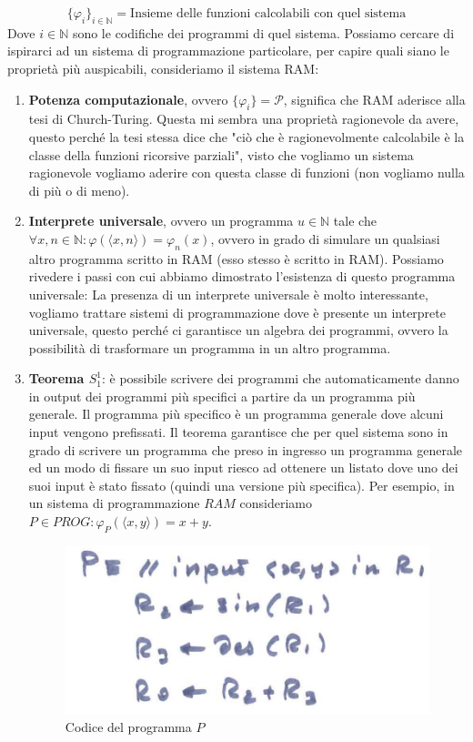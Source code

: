 \documentclass{article}
\begin{document}
$$\{\varphi_i\}_{i\in\mathbb{N}}=\text{Insieme delle funzioni calcolabili con quel sistema}$$
Dove $i\in\mathbb{N}$ sono le codifiche dei programmi di quel sistema.
Possiamo cercare di ispirarci ad un sistema di programmazione particolare, per capire
quali siano le proprietà più auspicabili, consideriamo il sistema RAM:
\begin{enumerate}
    \item \textbf{Potenza computazionale}, ovvero $\{\varphi_i\}=\mathcal{P}$, significa che RAM
          aderisce alla tesi di Church-Turing. Questa mi sembra una proprietà ragionevole da avere,
          questo perché la tesi stessa dice che "ciò che è ragionevolmente calcolabile è la classe della
          funzioni ricorsive parziali", visto che vogliamo un sistema ragionevole vogliamo aderire con
          questa classe di funzioni (non vogliamo nulla di più o di meno).
    \item \textbf{Interprete universale}, ovvero un programma $u\in\mathbb{N}$ tale che
          $\forall x,n\in\mathbb{N}:\varphi(\langle x,n\rangle)=\varphi_n(x)$, ovvero in grado di
          simulare un qualsiasi altro programma scritto in RAM (esso stesso è scritto in RAM). Possiamo
          rivedere i passi con cui abbiamo dimostrato l'esistenza di questo programma universale:
          La presenza di un interprete universale è molto interessante, vogliamo trattare sistemi di programmazione
          dove è presente un interprete universale, questo perché ci garantisce un algebra dei programmi, ovvero
          la possibilità di trasformare un programma in un altro programma.
    \item \textbf{Teorema $S_1^1$}: è possibile scrivere dei programmi che automaticamente danno in output dei programmi
          più specifici a partire da un programma più generale. Il programma più specifico è un programma generale dove
          alcuni input vengono prefissati. Il teorema garantisce che per quel sistema sono in grado di scrivere un programma
          che preso in ingresso un programma generale ed un modo di fissare un suo input riesco ad ottenere un listato dove uno dei
          suoi input è stato fissato (quindi una versione più specifica).
          Per esempio, in un sistema di programmazione $RAM$ consideriamo $P\in PROG:\varphi_P(\langle x,y\rangle)=x+y$.
          \begin{figure}[H]
              \centering
              \includegraphics[scale=0.5]{images/programma_p.png}
              \caption{Codice del programma $P$}
          \end{figure}


\end{enumerate}
\end{document}
